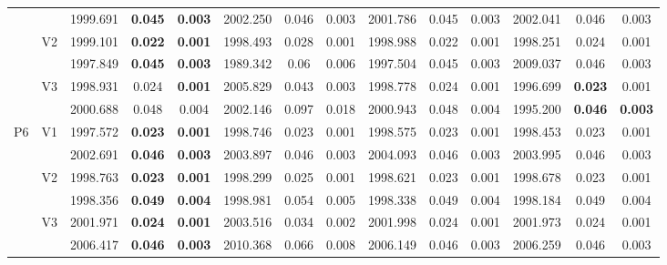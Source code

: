 \documentclass[12pt,a4paper]{article}
\begin{document}
\begin{sidewaystable}[ht]
{\begin{tabular}{cc|ccc|ccc|ccc|ccc|}
   &  & 1999.691 & \textbf{0.045} & \textbf{0.003} & 2002.250 & 0.046 & 0.003 & 2001.786 & 0.045 & 0.003 & 2002.041 & 0.046 & 0.003 \\ 
   & \multirow{2}{*}{V2} & 1999.101 & \textbf{0.022} & \textbf{0.001} & 1998.493 & 0.028 & 0.001 & 1998.988 & 0.022 & 0.001 & 1998.251 & 0.024 & 0.001 \\ 
   &  & 1997.849 & \textbf{0.045} & \textbf{0.003} & 1989.342 & 0.06 & 0.006 & 1997.504 & 0.045 & 0.003 & 2009.037 & 0.046 & 0.003 \\ 
   & \multirow{2}{*}{V3} & 1998.931 & 0.024 & \textbf{0.001} & 2005.829 & 0.043 & 0.003 & 1998.778 & 0.024 & 0.001 & 1996.699 & \textbf{0.023} & 0.001 \\ 
   &  & 2000.688 & 0.048 & 0.004 & 2002.146 & 0.097 & 0.018 & 2000.943 & 0.048 & 0.004 & 1995.200 & \textbf{0.046} & \textbf{0.003} \\ 
   \hline \hline\multirow{6}{*}{P6} & \multirow{2}{*}{V1} & 1997.572 & \textbf{0.023} & \textbf{0.001} & 1998.746 & 0.023 & 0.001 & 1998.575 & 0.023 & 0.001 & 1998.453 & 0.023 & 0.001 \\ 
   &  & 2002.691 & \textbf{0.046} & \textbf{0.003} & 2003.897 & 0.046 & 0.003 & 2004.093 & 0.046 & 0.003 & 2003.995 & 0.046 & 0.003 \\ 
   & \multirow{2}{*}{V2} & 1998.763 & \textbf{0.023} & \textbf{0.001} & 1998.299 & 0.025 & 0.001 & 1998.621 & 0.023 & 0.001 & 1998.678 & 0.023 & 0.001 \\ 
   &  & 1998.356 & \textbf{0.049} & \textbf{0.004} & 1998.981 & 0.054 & 0.005 & 1998.338 & 0.049 & 0.004 & 1998.184 & 0.049 & 0.004 \\ 
   & \multirow{2}{*}{V3} & 2001.971 & \textbf{0.024} & \textbf{0.001} & 2003.516 & 0.034 & 0.002 & 2001.998 & 0.024 & 0.001 & 2001.973 & 0.024 & 0.001 \\ 
   &  & 2006.417 & \textbf{0.046} & \textbf{0.003} & 2010.368 & 0.066 & 0.008 & 2006.149 & 0.046 & 0.003 & 2006.259 & 0.046 & 0.003 \\ 
   \hline
\end{tabular}
}
\end{sidewaystable}
\end{document}
